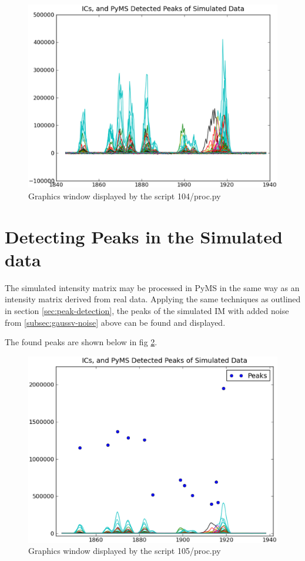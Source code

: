 \begin{figure}[h]
  \begin{center}
    \includegraphics[scale=0.25]{graphics/chapter10/test-104.eps}
  \end{center}
  \caption{Graphics window displayed by the script 104/proc.py}
  \label{fig:gaussv-noise}
\end{figure}

\section{Detecting Peaks in the Simulated data}


The simulated intensity matrix may be processed in PyMS in the same way as an intensity
matrix derived from real data. Applying the same techniques as outlined in section 
\ref{sec:peak-detection}, the peaks of the simulated IM with added noise from 
\ref{subsec:gaussv-noise} above can be found and displayed.

The found peaks are shown below in fig \ref{fig:sim-peaks}.

\begin{figure}[h]
  \begin{center}
    \includegraphics[scale=0.25]{graphics/chapter10/test-105.eps}
  \end{center}
  \caption{Graphics window displayed by the script 105/proc.py}
  \label{fig:sim-peaks}
\end{figure}